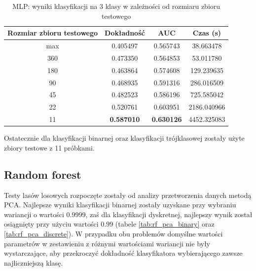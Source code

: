 \documentclass[a4paper, twoside, 11pt, openright]{article}
\begin{document}
\begin{table}[H]
    \centering
    \begin{tabular}{|c|c|c|c|}
    \hline
        \textbf{Rozmiar zbioru testowego} & \textbf{Dokładność} &  \textbf{AUC} &  \textbf{Czas (s)} \\ \hline
max                           &  0.405497 &  0.565743 &   38.663478 \\ \hline
360                         &  0.473350 &  0.564853 &   53.011780 \\ \hline
180                         &  0.463864 &  0.574608 &   129.239635 \\ \hline
90                        &  0.468935 &  0.591316 &   286.016509 \\ \hline
45                          &  0.482523 &  0.586196 &   725.585042 \\ \hline
22                         &  0.520761 &  0.603951 &  2186.040966 \\ \hline
11                          &  \textbf{0.587010} &  \textbf{0.630126} &  4452.325083 \\ \hline

    \end{tabular}
    \caption{MLP: wyniki klasyfikacji na 3 klasy w zależności od rozmiaru zbioru testowego}
    \label{tab:nn_walk_forward_test_discrete}
\end{table}

Ostatecznie dla klasyfikacji binarnej oraz klasyfikacji trójklasowej zostały użyte zbiory testowe z 11 próbkami.

\subsection{Random forest}

Testy lasów losowych rozpoczęte zostały od analizy przetworzenia danych metodą PCA. Najlepsze wyniki klasyfikacji binarnej zostały uzyskane przy wybraniu wariancji o wartości $0.9999$, zaś dla klasyfikacji dyskretnej, najlepszy wynik został osiągnięty przy użyciu wartości $0.99$ (tabele \ref{tab:rf_pca_binary} oraz \ref{tab:rf_pca_discrete}). W przypadku obu problemów domyślne wartości parametrów w zestawieniu z różnymi wartościami wariancji nie były wystarczające, aby przekroczyć dokładność klasyfikatora wybierającego zawsze najliczniejszą klasę.
\end{document}
